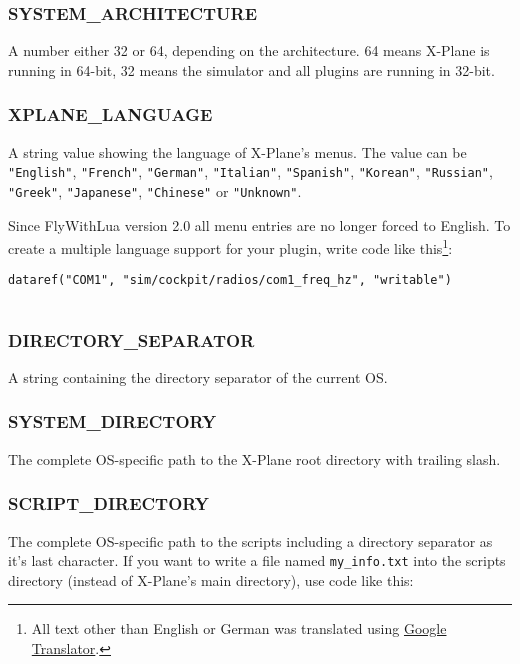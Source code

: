 \documentclass[11pt,parskip=half,a4paper]{scrartcl}
\begin{document}
\subsubsection{SYSTEM\_ARCHITECTURE}

A number either 32 or 64, depending on the architecture. 64 means X-Plane is running in 64-bit, 32 means the simulator and all plugins are running in 32-bit.

\subsubsection{XPLANE\_LANGUAGE}

A string value showing the language of X-Plane's menus. The value can be \verb|"English"|, \verb|"French"|, \verb|"German"|, \verb|"Italian"|, \verb|"Spanish"|, \verb|"Korean"|, \verb|"Russian"|, \verb|"Greek"|, \verb|"Japanese"|, \verb|"Chinese"| or \verb|"Unknown"|.

\newpage
Since FlyWithLua version 2.0 all menu entries are no longer forced to English. To create a multiple language support for your plugin, write code like this\footnote{All text other than English or German was translated using \href{http://translate.google.com/}{Google Translator}.}:

\begin{lstlisting}
dataref("COM1", "sim/cockpit/radios/com1_freq_hz", "writable")


\end{lstlisting}

\subsubsection{DIRECTORY\_SEPARATOR}

A string containing the directory separator of the current OS.

\subsubsection{SYSTEM\_DIRECTORY}

The complete OS-specific path to the X-Plane root directory with trailing slash.

\subsubsection{SCRIPT\_DIRECTORY}

The complete OS-specific path to the scripts including a directory separator as it's last character. If you want to write a file named \verb|my_info.txt| into the scripts directory (instead of X-Plane's main directory), use code like this:
\end{document}
